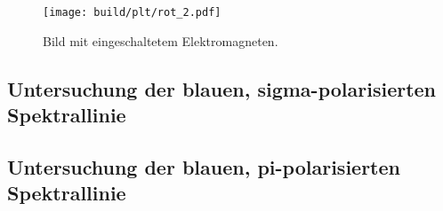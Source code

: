 \begin{figure}
    \centering
    \texttt{[image: build/plt/rot\_2.pdf]}
    \caption{Bild mit eingeschaltetem Elektromagneten.}
    \label{fig:plt:rot_2}
\end{figure}


\FloatBarrier
\subsection{Untersuchung der blauen, sigma-polarisierten Spektrallinie}
\lipsum[1]


\FloatBarrier
\subsection{Untersuchung der blauen, pi-polarisierten Spektrallinie}
\lipsum[1]
